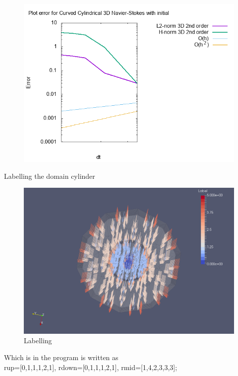 \documentclass{beamer}
\begin{document}
\begin{frame}
\begin{figure}
	\centering
	\includegraphics[width=0.9\linewidth]{NS_3D/error_curved}
	\caption{}
	\label{fig:errorcurved}
\end{figure}
\end{frame}

\begin{frame}{Labelling the domain cylinder}
\begin{figure}
	\centering
	\includegraphics[width=0.7\linewidth]{NS_3D/Label}
	\caption{Labelling}
	\label{fig:label}
\end{figure}
Which is in the program is written as\\
rup=[0,1,1,1,2,1], rdown=[0,1,1,1,2,1], rmid=[1,4,2,3,3,3];
\end{frame}
\end{document}
